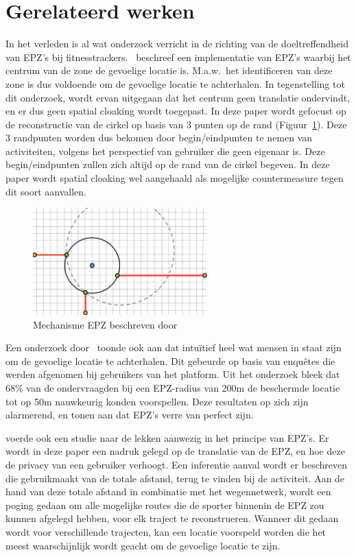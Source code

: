 \section{Gerelateerd werken}
In het verleden is al wat onderzoek verricht in de richting van de
doeltreffendheid van EPZ's bij fitnesstrackers.~\citeauthor{sec18has3:online}
beschreef een implementatie van EPZ's waarbij het centrum van de zone de
gevoelige locatie is. M.a.w.\ het identificeren van deze zone is dus voldoende
om de gevoelige locatie te achterhalen\cite{sec18has3:online}. In tegenstelling
tot dit onderzoek, wordt ervan uitgegaan dat het centrum geen translatie
ondervindt, en er dus geen spatial cloaking wordt toegepast. In deze paper
wordt gefocust op de reconstructie van de cirkel op basis van 3 punten op de
rand (Figuur~\ref{fig:Hassan_EPZ}). Deze 3 randpunten worden dus bekomen door
begin/eindpunten te nemen van activiteiten, volgens het perspectief van
gebruiker die geen eigenaar is. Deze begin/eindpunten zullen zich altijd op de
rand van de cirkel begeven. In deze paper wordt spatial cloaking wel aangehaald
als mogelijke countermeasure tegen dit soort aanvallen.
\begin{figure}[h]
    \centering
    \includegraphics[width=0.6\textwidth]{fig/EPZ-mechanisme/Hassan.png}
    \caption{Mechanisme EPZ beschreven door \citeauthor{sec18has3:online}}\label{fig:Hassan_EPZ}
\end{figure}

Een onderzoek door~\citeauthor{10.1145/3491102.3502136} toonde ook aan dat
intuïtief heel wat mensen in staat zijn om de gevoelige locatie te achterhalen.
Dit gebeurde op basis van enquêtes die werden afgenomen bij gebruikers van het
platform. Uit het onderzoek bleek dat 68\% van de ondervraagden bij een
EPZ-radius van 200m de beschermde locatie tot op 50m nauwkeurig konden
voorspellen. Deze resultaten op zich zijn alarmerend, en tonen aan dat EPZ's
verre van perfect zijn.

\citeauthor{Dhondt_Pochat_Voulimeneas_Joosen_Volckaert_2022} voerde ook een studie naar de lekken aanwezig in het principe van EPZ's. Er
wordt in deze paper een nadruk gelegd op de translatie van de EPZ, en hoe deze
de privacy van een gebruiker verhoogt. Een inferentie aanval wordt er
beschreven die gebruikmaakt van de totale afstand, terug te vinden bij de
activiteit. Aan de hand van deze totale afstand in combinatie met het
wegennetwerk, wordt een poging gedaan om alle mogelijke routes die de sporter binnenin de EPZ zou kunnen afgelegd hebben, voor elk traject te
reconstrueren. Wanneer dit gedaan wordt voor verschillende trajecten, kan een
locatie voorspeld worden die het meest waarschijnlijk wordt geacht om de
gevoelige locatie te zijn.


